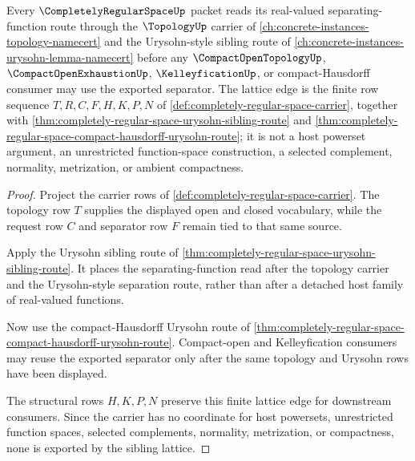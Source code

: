\begin{theorem}
\label{thm:completely-regular-space-topology-urysohn-sibling-lattice}
Every $\CompletelyRegularSpaceUp$ packet reads its real-valued separating-function route through the $\TopologyUp$ carrier of \autoref{ch:concrete-instances-topology-namecert} and the Urysohn-style sibling route of \autoref{ch:concrete-instances-urysohn-lemma-namecert} before any $\CompactOpenTopologyUp$, $\CompactOpenExhaustionUp$, $\KelleyficationUp$, or compact-Hausdorff consumer may use the exported separator. The lattice edge is the finite row sequence $T,R,C,F,H,K,P,N$ of \autoref{def:completely-regular-space-carrier}, together with \autoref{thm:completely-regular-space-urysohn-sibling-route} and \autoref{thm:completely-regular-space-compact-hausdorff-urysohn-route}; it is not a host powerset argument, an unrestricted function-space construction, a selected complement, normality, metrization, or ambient compactness.
\end{theorem}
\begin{proof}
Project the carrier rows of \autoref{def:completely-regular-space-carrier}. The topology row $T$ supplies the displayed open and closed vocabulary, while the request row $C$ and separator row $F$ remain tied to that same source.

Apply the Urysohn sibling route of \autoref{thm:completely-regular-space-urysohn-sibling-route}. It places the separating-function read after the topology carrier and the Urysohn-style separation route, rather than after a detached host family of real-valued functions.

Now use the compact-Hausdorff Urysohn route of \autoref{thm:completely-regular-space-compact-hausdorff-urysohn-route}. Compact-open and Kelleyfication consumers may reuse the exported separator only after the same topology and Urysohn rows have been displayed.

The structural rows $H,K,P,N$ preserve this finite lattice edge for downstream consumers. Since the carrier has no coordinate for host powersets, unrestricted function spaces, selected complements, normality, metrization, or compactness, none is exported by the sibling lattice.
\end{proof}

